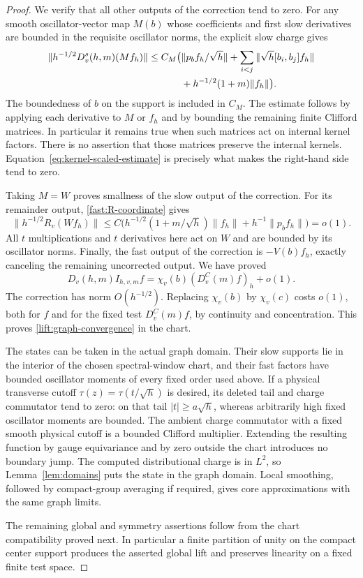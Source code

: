 \begin{proof}
We verify that all other outputs of the correction tend to zero.
For any smooth oscillator-vector map $M(b)$ whose coefficients
and first slow derivatives are bounded in the requisite oscillator
norms, the explicit slow charge gives
\begin{align}
 \|h^{-1/2}D_v^s(h,m)(M f_h)\|
 \leq C_M\bigl(&\|p_b f_h/\sqrt h\|
      +\sum_{i<j}\|\sqrt h[b_i,b_j]f_h\|\notag\\
      &+h^{-1/2}(1+m)\|f_h\|\bigr).
 \label{lift:matrix-stability}
\end{align}
The boundedness of $b$ on the support is included in $C_M$.
The estimate follows by applying each derivative to $M$ or $f_h$
and by bounding the remaining finite Clifford matrices. In
particular it remains true when such matrices act on internal
kernel factors. There is no assertion that those matrices
preserve the internal kernels. Equation~\eqref{eq:kernel-scaled-estimate}
is precisely what makes the right-hand side tend to zero.

Taking $M=W$ proves smallness of the slow output of the correction.
For its remainder output, \eqref{fast:R-coordinate} gives
\[
 \|h^{-1/2}R_v(W f_h)\|
 \leq C\bigl(h^{-1/2}(1+m/\sqrt h)\|f_h\|
                    +h^{-1}\|p_b f_h\|\bigr)=o(1).
\]
All $t$ multiplications and $t$ derivatives here act on $W$ and
are bounded by its oscillator norms. Finally, the fast output
of the correction is $-V(b)f_h$, exactly canceling the remaining
uncorrected output. We have proved
\[
 D_v(h,m)I_{h,v,m}f
                  =\chi_v(b)(D_v^C(m)f)_h+o(1).
\]
The correction has norm $O(h^{-1/2})$.
Replacing $\chi_v(b)$ by $\chi_v(c)$ costs $o(1)$, both for $f$
and for the fixed test $D_v^C(m)f$, by continuity and concentration.
This proves \eqref{lift:graph-convergence} in the chart.

The states can be taken in the actual graph domain. Their slow
supports lie in the interior of the chosen spectral-window chart,
and their fast factors have bounded oscillator moments of every
fixed order used above. If a physical transverse cutoff
$\tau(z)=\tau(t/\sqrt h)$ is desired, its deleted tail and charge
commutator tend to zero: on that tail $|t|\geq a\sqrt h$, whereas
arbitrarily high fixed oscillator moments are bounded. The
ambient charge commutator with a fixed smooth physical cutoff is
a bounded Clifford multiplier. Extending the resulting function
by gauge equivariance and by zero outside the chart introduces
no boundary jump. The computed distributional charge is in $L^2$,
so Lemma~\ref{lem:domains} puts the state in the graph domain.
Local smoothing, followed by compact-group averaging if required,
gives core approximations with the same graph limits.

The remaining global and symmetry assertions follow from the
chart compatibility proved next. In particular a finite partition
of unity on the compact center support produces the asserted
global lift and preserves linearity on a fixed finite test space.
\end{proof}

